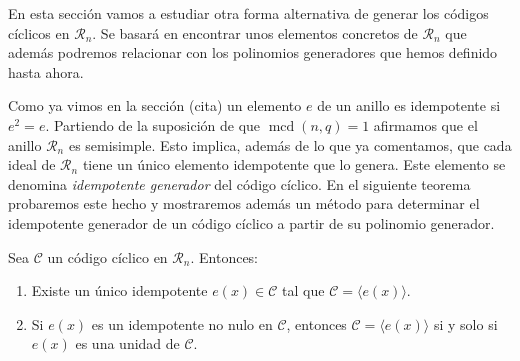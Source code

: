 En esta sección vamos a estudiar otra forma alternativa de generar los códigos cíclicos en \(\mathcal R_n\).
Se basará en encontrar unos elementos concretos de \(\mathcal R_n\) que además podremos relacionar con los polinomios generadores que hemos definido hasta ahora.

Como ya vimos en la sección (cita) un elemento \(e\) de un anillo es idempotente si \(e^2 = e\).
Partiendo de la suposición de que \(\operatorname{mcd}(n, q) = 1\) afirmamos que el anillo \(\mathcal R_n\) es semisimple.
Esto implica, además de lo que ya comentamos, que cada ideal de \(\mathcal R_n\) tiene un único elemento idempotente que lo genera.
Este elemento se denomina \textit{idempotente generador} del código cíclico.
En el siguiente teorema probaremos este hecho y mostraremos además un método para determinar el idempotente generador de un código cíclico a partir de su polinomio generador.

\begin{theorem}
  \label{th:idempotente-unico-unidad}
  Sea \(\mathcal C\) un código cíclico en \(\mathcal R_n\). Entonces:
  \begin{enumerate}
    \item Existe un único idempotente \(e(x) \in \mathcal C\) tal que \(\mathcal C = \langle e(x)\rangle\).
    \item \label{th:idempotente-unico-unidad:unidad} Si \(e(x)\) es un idempotente no nulo en \(\mathcal C\), entonces \(\mathcal C = \langle e(x)\rangle\) si y solo si \(e(x)\) es una unidad de \(\mathcal C\).
  \end{enumerate}
\end{theorem}

